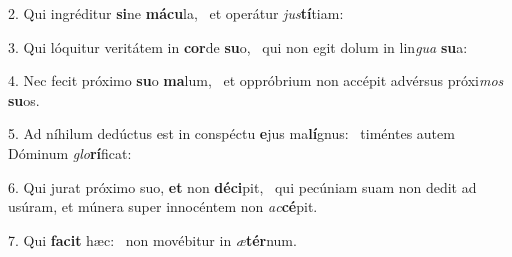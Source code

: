2. Qui ingréditur \textbf{si}ne \textbf{má}\textbf{cu}la, \ast\  et operátur \textit{jus}\textbf{tí}tiam:\

3. Qui lóquitur veritátem in \textbf{cor}de \textbf{su}o, \ast\  qui non egit dolum in lin\textit{gua} \textbf{su}a:\

4. Nec fecit próximo \textbf{su}o \textbf{ma}lum, \ast\  et oppróbrium non accépit advérsus próxi\textit{mos} \textbf{su}os.\

5. Ad níhilum dedúctus est in conspéctu \textbf{e}jus ma\textbf{lí}gnus: \ast\  timéntes autem Dóminum \textit{glo}\textbf{rí}ficat:\

6. Qui jurat próximo suo, \textbf{et} non \textbf{dé}\textbf{ci}pit, \ast\  qui pecúniam suam non dedit ad usúram, et múnera super innocéntem non \textit{ac}\textbf{cé}pit.\

7. Qui \textbf{fa}\textbf{cit} hæc: \ast\  non movébitur in \textit{æ}\textbf{tér}num.\


